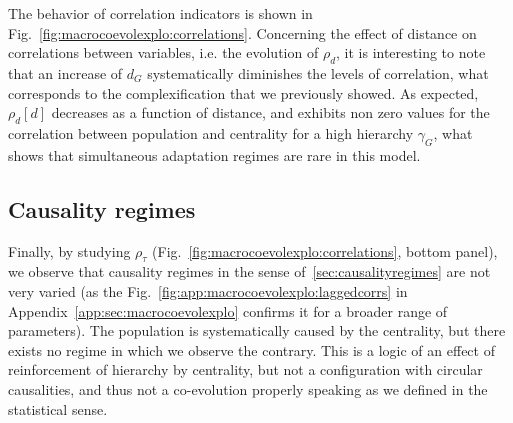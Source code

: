 The behavior of correlation indicators is shown in Fig.~\ref{fig:macrocoevolexplo:correlations}. Concerning the effect of distance on correlations between variables, i.e. the evolution of $\rho_d$, it is interesting to note that an increase of $d_G$ systematically diminishes the levels of correlation, what corresponds to the complexification that we previously showed. As expected, $\rho_d\left[d\right]$ decreases as a function of distance, and exhibits non zero values for the correlation between population and centrality for a high hierarchy $\gamma_G$, what shows that simultaneous adaptation regimes are rare in this model.


\subsection{Causality regimes}


Finally, by studying $\rho_{\tau}$ (Fig.~\ref{fig:macrocoevolexplo:correlations}, bottom panel), we observe that causality regimes in the sense of~\ref{sec:causalityregimes} are not very varied (as the Fig.~\ref{fig:app:macrocoevolexplo:laggedcorrs} in Appendix~\ref{app:sec:macrocoevolexplo} confirms it for a broader range of parameters). The population is systematically caused by the centrality, but there exists no regime in which we observe the contrary. This is a logic of an effect of reinforcement of hierarchy by centrality, but not a configuration with circular causalities, and thus not a co-evolution properly speaking as we defined in the statistical sense.








